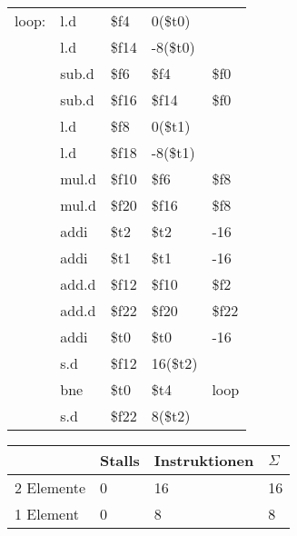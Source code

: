 \begin{enumerate}[(a)]
{
	\ttfamily
	\begin{tabular}{l llll}
		loop: & l.d   & \$f4  & 0(\$t0)             &                \\
		      & l.d   & \$f14 & -8(\$t0)            &                \\
		      & sub.d & \$f6  & \$f4                & \$f0           \\
		      & sub.d & \$f16 & \$f14               & \$f0           \\
		      & l.d   & \$f8  & 0(\$t1)             &                \\
		      & l.d   & \$f18 & -8(\$t1)            &                \\
		      & mul.d & \$f10 & \$f6                & \$f8           \\
		      & mul.d & \$f20 & \$f16               & \$f8           \\
		      & addi  & \$t2  & \$t2                & \color{red}-16 \\
		      & addi  & \$t1  & \$t1                & \color{red}-16 \\
		      & add.d & \$f12 & \$f10               & \$f2           \\
		      & add.d & \$f22 & \$f20               & \$f22          \\
		      & addi  & \$t0  & \$t0                & -16            \\
		      & s.d   & \$f12 & \color{red}16(\$t2) &                \\
		      & bne   & \$t0  & \$t4                & loop           \\
		      & s.d   & \$f22 & \color{red}8(\$t2)  &
	\end{tabular}
}
	\begin{tabular}{llll}
		\hline
		           & Stalls & Instruktionen & $ \Sigma $ \\ \hline
		2 Elemente & 0      & 16            & 16         \\
		1 Element  & 0      & 8             & 8          \\ \hline
	\end{tabular}

\end{enumerate}